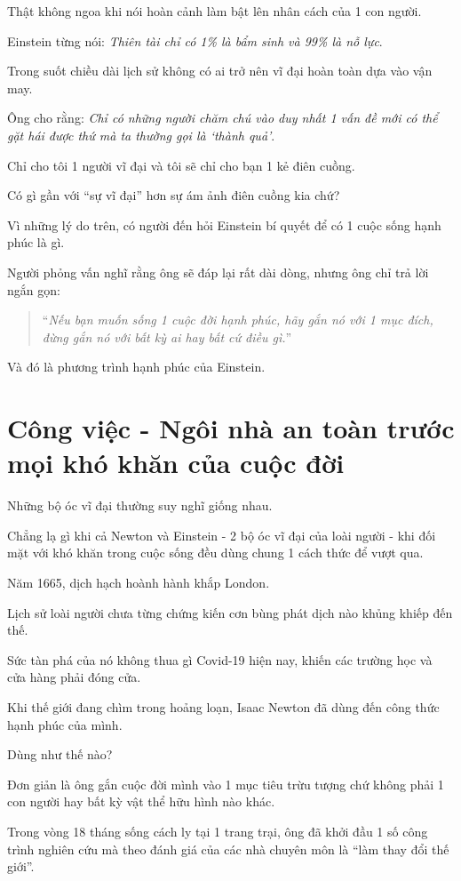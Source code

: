 \documentclass{book}
\numberwithin{equation}{section}
\begin{document}
Thật không ngoa khi nói hoàn cảnh làm bật lên nhân cách của 1 con người.

%
Einstein từng nói: \textit{Thiên tài chỉ có 1\% là bẩm sinh và 99\% là nỗ lực}.

Trong suốt chiều dài lịch sử không có ai trở nên vĩ đại hoàn toàn dựa vào vận may.

Ông cho rằng: \textit{Chỉ có những người chăm chú vào duy nhất 1 vấn đề mới có thể gặt hái được thứ mà ta thường gọi là `thành quả'}.

%
Chỉ cho tôi 1 người vĩ đại và tôi sẽ chỉ cho bạn 1 kẻ điên cuồng.

Có gì gần với ``sự vĩ đại'' hơn sự ám ảnh điên cuồng kia chứ?

%
Vì những lý do trên, có người đến hỏi Einstein bí quyết để có 1 cuộc sống hạnh phúc là gì.

Người phỏng vấn nghĩ rằng ông sẽ đáp lại rất dài dòng, nhưng ông chỉ trả lời ngắn gọn:
\begin{quotation}
    ``\textit{Nếu bạn muốn sống 1 cuộc đời hạnh phúc, hãy gắn nó với 1 mục đích, đừng gắn nó với bất kỳ ai hay bất cứ điều gì.}''
\end{quotation}
Và đó là phương trình hạnh phúc của Einstein.

\section{Công việc - Ngôi nhà an toàn trước mọi khó khăn của cuộc đời}
Những bộ óc vĩ đại thường suy nghĩ giống nhau.

Chẳng lạ gì khi cả Newton và Einstein - 2 bộ óc vĩ đại của loài người - khi đối mặt với khó khăn trong cuộc sống đều dùng chung 1 cách thức để vượt qua.

%
Năm 1665, dịch hạch hoành hành khắp London.

Lịch sử loài người chưa từng chứng kiến cơn bùng phát dịch nào khủng khiếp đến thế.

Sức tàn phá của nó không thua gì Covid-19 hiện nay, khiến các trường học và cửa hàng phải đóng cửa.

%
Khi thế giới đang chìm trong hoảng loạn, Isaac Newton đã dùng đến công thức hạnh phúc của mình.

Dùng như thế nào?

Đơn giản là ông gắn cuộc đời mình vào 1 mục tiêu trừu tượng chứ không phải 1 con người hay bất kỳ vật thể hữu hình nào khác.

Trong vòng 18 tháng sống cách ly tại 1 trang trại, ông đã khởi đầu 1 số công trình nghiên cứu mà theo đánh giá của các nhà chuyên môn là ``làm thay đổi thế giới''.
\end{document}
